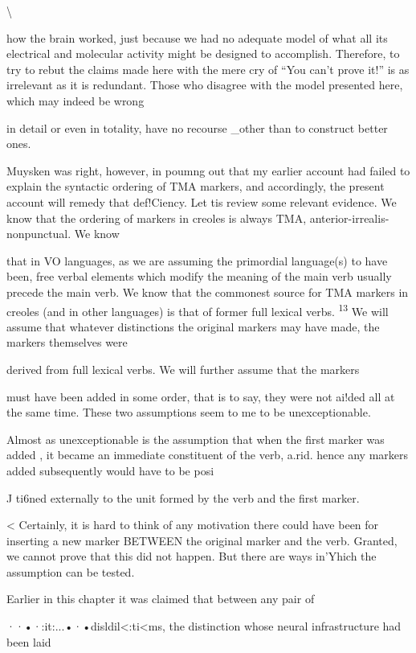 {\textbackslash}


how the brain worked, just because we had no adequate model of what all its electrical and molecular activity might be designed to accomplish. Therefore, to try to rebut the claims made here with the mere cry of ``You can't prove it!'' is as irrelevant as it is redundant. Those who disagree with the model presented here, which may indeed be wrong

in detail or even in totality, have no recourse \_other than to construct better ones.

Muysken was right, however, in poumng out that my earlier account had failed to explain the syntactic ordering of TMA markers, and accordingly, the present account will remedy that def!Ciency. Let tis review some relevant evidence. We know that the ordering of mark\-ers in creoles is always TMA, anterior-irrealis-nonpunctual. We know

that in VO languages, as we are assuming the primordial language(s) to have been, free verbal elements which modify the meaning of the main verb usually precede the main verb. We know that the commonest source for TMA markers in creoles (and in other languages) is that of former full lexical verbs. \textsuperscript{13} We will assume that whatever distinctions the original markers may have made, the markers themselves were

derived from full lexical verbs. We will further assume that the markers

must have been added in some order, that is to say, they were not ai!ded all at the same time. These two assumptions seem to me to be unexceptionable.

Almost as unexceptionable is the assumption that when the first marker was added , it became an immediate constituent of the verb, a.rid. hence any markers added subsequently would have to be posi{\textquotedbl}

J ti6ned externally to the unit formed by the verb and the first marker.

{\textless} Certainly, it is hard to think of any motivation there could have been for inserting a new marker BETWEEN the original marker and the verb. Granted, we cannot prove that this did not happen. But there are ways in'Yhich the assumption can be tested.

Earlier in this chapter it was claimed that between any pair of

··•·:it:...•·•disldil{\textless}:ti{\textless}ms, the distinction whose neural infrastructure had been laid

